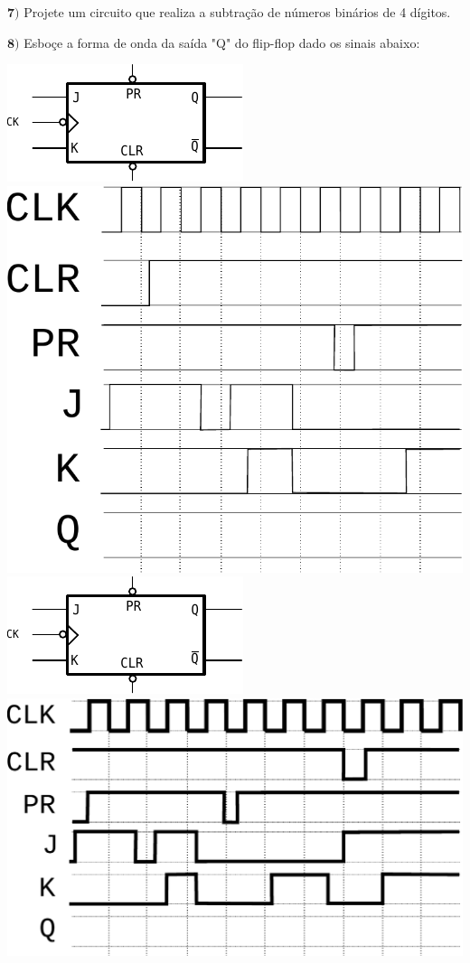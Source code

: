 \documentclass[12pt]{article}
\newcommand{\exerc}[3]{ \vspace{5pt} {$\mathbf{#1)}$} #2 \hfill {\it #3} }
\begin{document}
\exerc{7}{Projete um circuito que realiza a subtração de números binários de 4 dígitos.}{}

\exerc{8}{ Esboçe a forma de onda da saída "Q" do flip-flop dado os sinais abaixo:}
\\
\begin{multicols}{2}
\begin{center}
\includegraphics{fp-jk} \\ \vspace{15pt}
\includegraphics[scale=0.5]{sig1} \\
\includegraphics{fp-jk} \\ \vspace{15pt}
\includegraphics[scale=0.5]{sig2}
\end{center}
\end{multicols}
\end{document}
